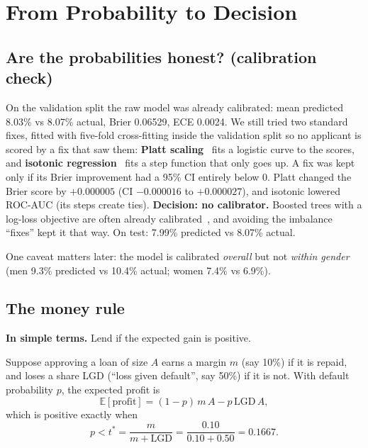 \documentclass[conference,10pt]{IEEEtran}
\newcommand{\simple}[1]{\par\smallskip\noindent\colorbox{gray!13}{\parbox{\dimexpr\columnwidth-2\fboxsep\relax}{\small\textbf{In simple terms.} #1}}\par\smallskip}
\begin{document}
\section{From Probability to Decision}
\label{sec:decisions}

\subsection{Are the probabilities honest? (calibration check)}
On the validation split the raw model was already calibrated: mean predicted 8.03\% vs 8.07\%
actual, Brier 0.06529, ECE 0.0024. We still tried two standard fixes, fitted with five-fold
cross-fitting inside the validation split so no applicant is scored by a fix that saw them:
\textbf{Platt scaling}~\cite{platt1999} fits a logistic curve to the scores, and
\textbf{isotonic regression}~\cite{zadrozny2002} fits a step function that only goes up. A fix
was kept only if its Brier improvement had a 95\% CI entirely below 0. Platt changed the Brier
score by $+0.000005$ (CI $-0.000016$ to $+0.000027$), and isotonic lowered ROC-AUC (its steps
create ties). \textbf{Decision: no calibrator.} Boosted trees with a log-loss objective are often
already calibrated~\cite{niculescu2005}, and avoiding the imbalance ``fixes'' kept it that way.
On test: 7.99\% predicted vs 8.07\% actual.

One caveat matters later: the model is calibrated \emph{overall} but not \emph{within gender}
(men 9.3\% predicted vs 10.4\% actual; women 7.4\% vs 6.9\%).

\subsection{The money rule}
\simple{Lend if the expected gain is positive.}

Suppose approving a loan of size $A$ earns a margin $m$ (say 10\%) if it is repaid, and loses a
share LGD (``loss given default'', say 50\%) if it is not. With default probability $p$, the
expected profit is
\begin{equation}
\mathbb{E}[\text{profit}] = (1-p)\,m\,A - p\,\mathrm{LGD}\,A ,
\end{equation}
which is positive exactly when
\begin{equation}
p < t^\ast = \frac{m}{m + \mathrm{LGD}} = \frac{0.10}{0.10 + 0.50} = 0.1667 .
\end{equation}
\end{document}

